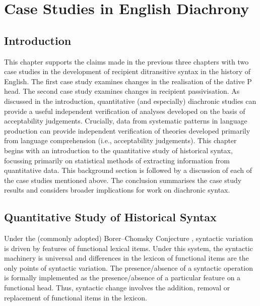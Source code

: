 \chapter{Case Studies in English Diachrony}\label{ch:diachron}
\section{Introduction}
This chapter supports the claims made in the previous three chapters with two case studies in the development of recipient ditransitive syntax in the history of English. The first case study examines changes in the realisation of the dative P head. The second case study examines changes in recipient passivisation. As discussed in the introduction, quantitative (and especially) diachronic studies can provide a useful independent verification of analyses developed on the basis of acceptability judgements. Crucially, data from systematic patterns in language production can provide independent verification of theories developed primarily from language comprehension (i.e., acceptability judgements). This chapter begins with an introduction to the quantitative study of historical syntax, focussing primarily on statistical methods of extracting information from quantitative data. This background section is followed by a discussion of each of the case studies mentioned above. The conclusion summarises the case study results and considers broader implications for work on diachronic syntax.

\section{Quantitative Study of Historical Syntax}\label{sec:log-reg}
	Under the (commonly adopted) Borer--Chomsky Conjecture \citep{Baker.2008}, syntactic variation is driven by features of functional lexical items. Under this system, the syntactic machinery is universal and differences in the lexicon of functional items are the only points of syntactic variation. The presence/absence of a syntactic operation is formally implemented as the presence/absence of a particular feature on a functional head. Thus, syntactic change involves the addition, removal or replacement of functional items in the lexicon.


